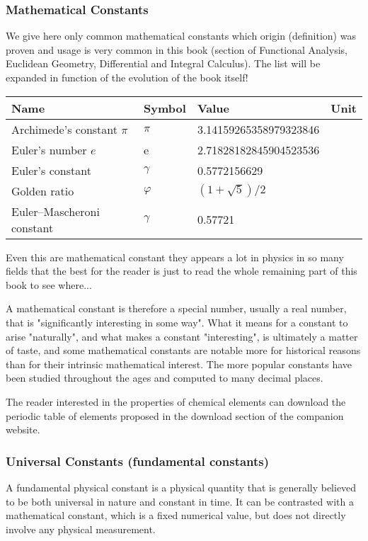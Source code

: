 	\subsubsection{Mathematical Constants}
	We give here only common mathematical constants which origin (definition) was proven and usage is very common in this book (section of Functional Analysis, Euclidean Geometry, Differential and Integral Calculus). The list will be expanded in function of the evolution of the book itself!
	\begin{center}
		\begin{tabular}{||l|lll||}
		\hline
		{\textbf{Name}}&{\textbf{Symbol}}&{\textbf{Value}}&{\textbf{Unit}}\\
		\hline
		\hline
		Archimede's constant $\pi$  &$\pi$&3.14159265358979323846&\\
		Euler's number $e$          &e    &2.71828182845904523536&\\
		Euler's constant 			&$\gamma$ & 0.5772156629&\\
		Golden ratio	 			&$\varphi$ & $(1+\sqrt{5})/2$&\\
		Euler–Mascheroni constant  	&$\gamma$ & 0.57721&\\
		\hline
		\end{tabular}
	\end{center}
	Even this are mathematical constant they appears a lot in physics in so many fields that the best for the reader is just to read the whole remaining part of this book to see where...
	
	A mathematical constant is therefore a special number, usually a real number, that is "significantly interesting in some way". What it means for a constant to arise "naturally", and what makes a constant "interesting", is ultimately a matter of taste, and some mathematical constants are notable more for historical reasons than for their intrinsic mathematical interest. The more popular constants have been studied throughout the ages and computed to many decimal places.
	
	\begin{tcolorbox}[title=Remark,colframe=black,arc=10pt]
	The reader interested in the properties of chemical elements can download the periodic table of elements proposed in the download section of the companion website.
	\end{tcolorbox}

	\subsubsection{Universal Constants (fundamental constants)}
	A fundamental physical constant is a physical quantity that is generally believed to be both universal in nature and constant in time. It can be contrasted with a mathematical constant, which is a fixed numerical value, but does not directly involve any physical measurement.
	
